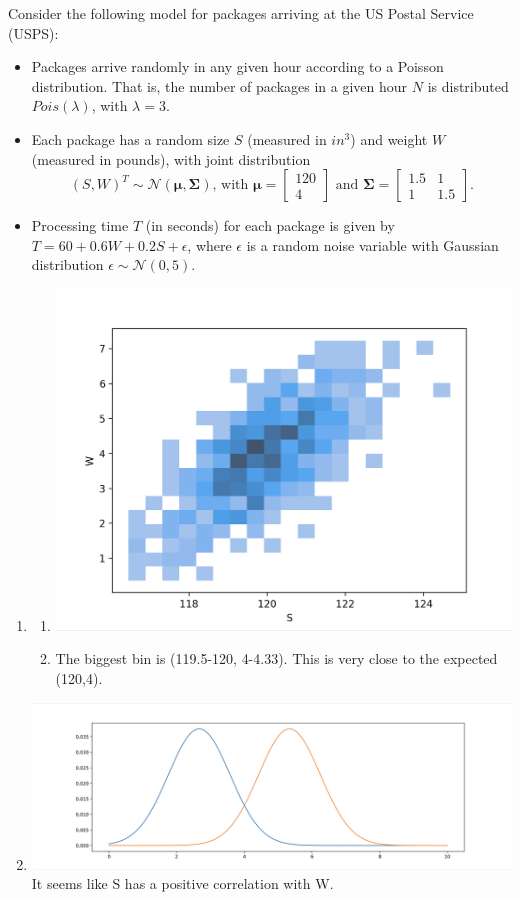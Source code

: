 \documentclass{harvardml}
\theoremstyle{definition}
\theoremstyle{plain}
\begin{document}
\begin{solution}
\noindent Consider the following model for packages arriving at the US Postal Service (USPS):
\begin{itemize}
    \item Packages arrive randomly in any given hour according to a Poisson distribution. That is, the number of packages in a given hour $N$ is distributed $Pois(\lambda)$, with $\lambda = 3$.
    \item Each package has a random size $S$ (measured in $in^3$) and weight $W$ (measured in pounds), with joint distribution
    $$(S, W)^{T} \sim \mathcal{N}\left( \boldsymbol{\mu}, \boldsymbol{\Sigma}\right) \text{, with } \boldsymbol{\mu} = \begin{bmatrix} 120 \\ 4 \end{bmatrix} \text{ and } \boldsymbol{\Sigma} = \begin{bmatrix} 1.5 & 1 \\ 1 & 1.5 \end{bmatrix}.$$
    \item Processing time $T$ (in seconds) for each package is given by $T = 60 + 0.6 W + 0.2 S + \epsilon$, where $\epsilon$ is a random noise variable with Gaussian distribution $\epsilon \sim \mathcal{N}(0, 5)$.
\end{itemize}
\begin{enumerate}
    \item
    \begin{enumerate}
        \item \includegraphics[width=0.4\linewidth]{P3Packages.png}
        \item The biggest bin is (119.5-120, 4-4.33). This is very close to the expected (120,4).
    \end{enumerate}
    \item \includegraphics[width=0.4\linewidth]{P3PDF.png} It seems like S has a positive correlation with W.

\end{enumerate}
\end{solution}
\end{document}
